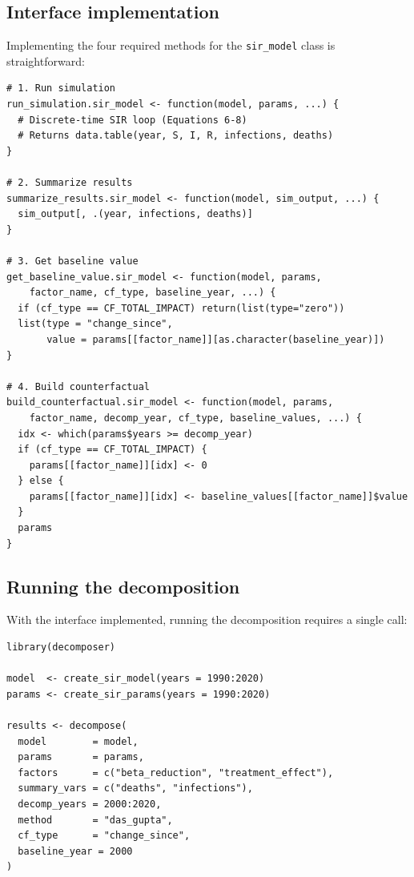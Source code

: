 \documentclass[11pt]{article}
\newcommand{\pkg}[1]{\texttt{#1}}
\newcommand{\code}[1]{\texttt{#1}}
\begin{document}
\subsection{Interface implementation}

Implementing the four required methods for the \code{sir\_model} class
is straightforward:

\begin{lstlisting}[caption={Implementing the \pkg{decomposer} interface for the SIR model.},
                   label=lst:sir]
# 1. Run simulation
run_simulation.sir_model <- function(model, params, ...) {
  # Discrete-time SIR loop (Equations 6-8)
  # Returns data.table(year, S, I, R, infections, deaths)
}

# 2. Summarize results
summarize_results.sir_model <- function(model, sim_output, ...) {
  sim_output[, .(year, infections, deaths)]
}

# 3. Get baseline value
get_baseline_value.sir_model <- function(model, params,
    factor_name, cf_type, baseline_year, ...) {
  if (cf_type == CF_TOTAL_IMPACT) return(list(type="zero"))
  list(type = "change_since",
       value = params[[factor_name]][as.character(baseline_year)])
}

# 4. Build counterfactual
build_counterfactual.sir_model <- function(model, params,
    factor_name, decomp_year, cf_type, baseline_values, ...) {
  idx <- which(params$years >= decomp_year)
  if (cf_type == CF_TOTAL_IMPACT) {
    params[[factor_name]][idx] <- 0
  } else {
    params[[factor_name]][idx] <- baseline_values[[factor_name]]$value
  }
  params
}
\end{lstlisting}

\subsection{Running the decomposition}

With the interface implemented, running the decomposition requires a
single call:

\begin{lstlisting}[caption={Running the decomposition.}, label=lst:run]
library(decomposer)

model  <- create_sir_model(years = 1990:2020)
params <- create_sir_params(years = 1990:2020)

results <- decompose(
  model        = model,
  params       = params,
  factors      = c("beta_reduction", "treatment_effect"),
  summary_vars = c("deaths", "infections"),
  decomp_years = 2000:2020,
  method       = "das_gupta",
  cf_type      = "change_since",
  baseline_year = 2000
)
\end{lstlisting}
\end{document}
